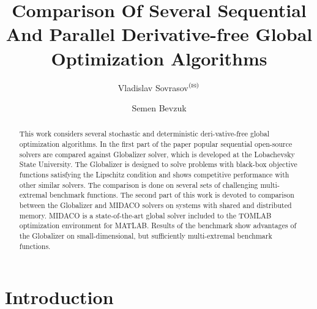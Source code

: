 \documentclass{svproc}
\def\letter{$^{\textrm{(\Letter)}}$}
\begin{document}
\mainmatter              %
%
\title{Comparison Of Several Sequential And Parallel Derivative-free Global Optimization Algorithms}
%
%
\author{Vladislav Sovrasov\letter \and Semen Bevzuk}
%
%
%

\maketitle              %

\begin{abstract}
This work considers several stochastic and deterministic deri-vative-free global optimization
algorithms. In the first part of the paper popular sequential open-source solvers are compared against
Globalizer solver, which is developed at the Lobachevsky State University. The Globalizer is
designed to solve problems with black-box objective functions satisfying the Lipschitz condition and shows
competitive performance with other similar solvers. The comparison is done on several sets of
challenging multi-extremal benchmark functions. The second part of this work is devoted to
comparison between the Globalizer and MIDACO solvers on systems with shared and distributed
memory. MIDACO is a state-of-the-art global solver included to the TOMLAB optimization
environment for MATLAB. Results of the benchmark show advantages of the Globalizer on small-dimensional, but sufficiently multi-extremal benchmark functions.
\end{abstract}
%
\section{Introduction}
\end{document}
